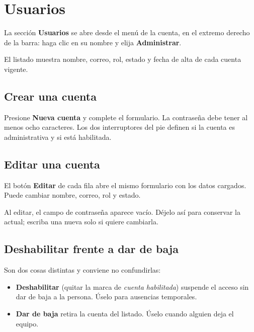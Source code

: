 \newpage
\section{Usuarios}

La sección \textbf{Usuarios} se abre desde el menú de la cuenta, en el extremo
derecho de la barra: haga clic en su nombre y elija \textbf{Administrar}.



El listado muestra nombre, correo, rol, estado y fecha de alta de cada cuenta
vigente.

\subsection{Crear una cuenta}

Presione \textbf{Nueva cuenta} y complete el formulario. La contraseña debe
tener al menos ocho caracteres. Los dos interruptores del pie definen si la
cuenta es administrativa y si está habilitada.


\subsection{Editar una cuenta}

El botón \textbf{Editar} de cada fila abre el mismo formulario con los datos
cargados. Puede cambiar nombre, correo, rol y estado.

\begin{nota}
Al editar, el campo de contraseña aparece vacío. Déjelo así para conservar la
actual; escriba una nueva solo si quiere cambiarla.
\end{nota}

\subsection{Deshabilitar frente a dar de baja}

Son dos cosas distintas y conviene no confundirlas:

\begin{itemize}[leftmargin=*, itemsep=3pt]
  \item \textbf{Deshabilitar} (quitar la marca de \emph{cuenta habilitada})
        suspende el acceso sin dar de baja a la persona. Úselo para ausencias
        temporales.
  \item \textbf{Dar de baja} retira la cuenta del listado. Úselo cuando alguien
        deja el equipo.
\end{itemize}

